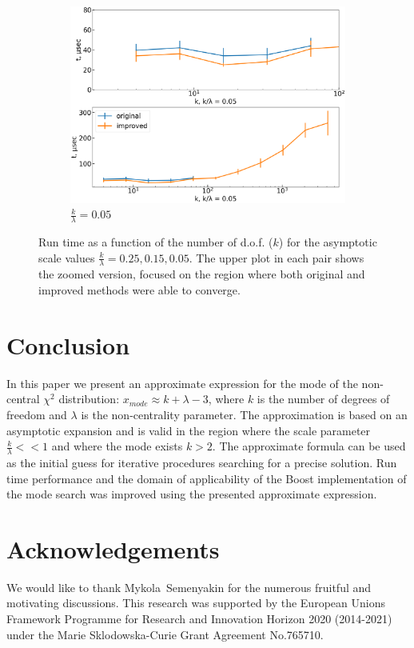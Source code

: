\documentclass[final,5p,twocolumn,preprint,nopreprintline,times,authoryear]{elsarticle}
\begin{document}
\begin{figure}[t]
\begin{subfigure}[t]{0.46\textwidth}
		\includegraphics[width=\linewidth]{boost_scale_fixed_0_05.png}
		\caption{$\frac{k}{\lambda}=0.05$}
	\end{subfigure}
	\caption{Run time as a function of the number of d.o.f. ($k$) for the asymptotic scale values $\frac{k}{\lambda}=0.25,0.15,0.05$. The upper plot in each pair shows the zoomed version, focused on the region where both original and improved methods were able to converge.}\label{fig:boost-lam-fixed}
\end{figure}

\section{Conclusion}
In this paper we present an approximate expression for the mode of the non-central $\chi^2$ distribution: $x_{mode} \approx k + \lambda - 3$, where $k$ is the number of degrees of freedom and $\lambda$ is the non-centrality parameter. The approximation is based on an asymptotic expansion and is valid in the region where the scale parameter $\frac{k}{\lambda} << 1$ and where the mode exists $k > 2$. The approximate formula can be used as the initial guess for iterative procedures searching for a precise solution. Run time performance and the domain of applicability of the Boost implementation of the mode search was improved using the presented approximate expression.

\section{Acknowledgements}

We would like to thank Mykola~Semenyakin for the numerous fruitful and motivating discussions. This research was supported by the European Unions Framework Programme for Research and Innovation Horizon 2020 (2014-2021) under the Marie Sklodowska-Curie Grant Agreement No.765710.



\end{document}
